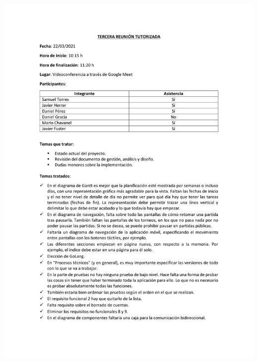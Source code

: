 \documentclass{article}
\begin{document}
\includegraphics[width=\textwidth]{../images/actas/Acta_reunion_tutorizada_3.pdf}
\end{document}
